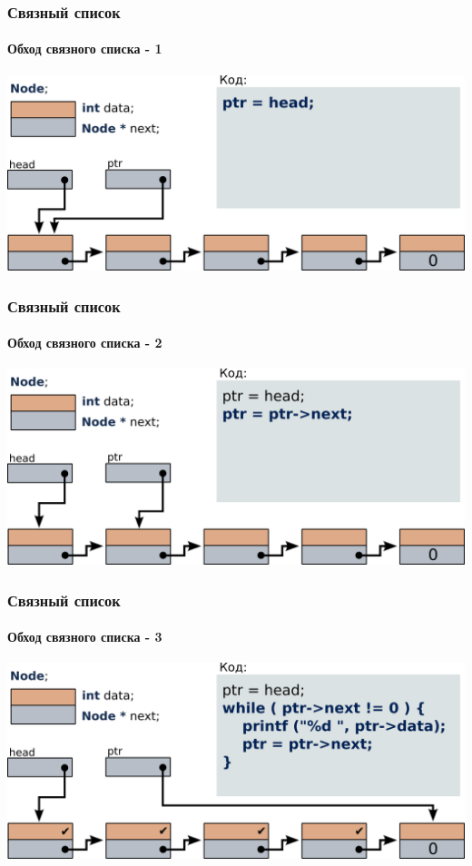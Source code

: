 \documentclass[14pt,pdf,hyperref={unicode}]{beamer}
\begin{document}
\begin{frame}[fragile]
\frametitle{Связный список} 
\framesubtitle{Обход связного списка - 1} 
\begin{center}
\includegraphics[width=0.99\linewidth]{images/list_traversal_1.png}
\end{center}
\end{frame}
\begin{frame}[fragile]
\frametitle{Связный список} 
\framesubtitle{Обход связного списка - 2} 
\begin{center}
\includegraphics[width=0.99\linewidth]{images/list_traversal_2.png}
\end{center}
\end{frame}
\begin{frame}[fragile]
\frametitle{Связный список} 
\framesubtitle{Обход связного списка - 3} 
\begin{center}
\includegraphics[width=0.99\linewidth]{images/list_traversal_3.png}
\end{center}
\end{frame}
\end{document}
